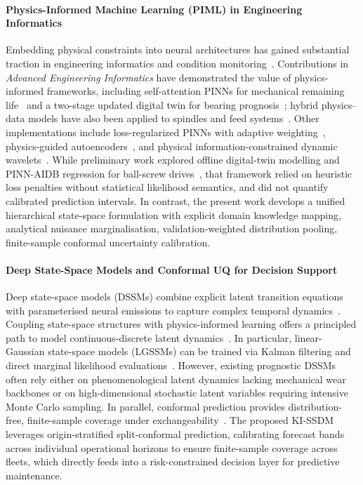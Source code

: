 \documentclass[a4paper,fleqn]{cas-dc}
\begin{document}
\paragraph{Physics-Informed Machine Learning (PIML) in Engineering Informatics}
Embedding physical constraints into neural architectures has gained substantial traction in engineering informatics and condition monitoring~\cite{Wu_2024, Xu_2023, Yan_2026, Lai_2024}. Contributions in \emph{Advanced Engineering Informatics} have demonstrated the value of physics-informed frameworks, including self-attention PINNs for mechanical remaining life~\cite{Liao_2023} and a two-stage updated digital twin for bearing prognosis~\cite{D_He_2025}; hybrid physics--data models have also been applied to spindles and feed systems~\cite{Tai_2023, Zhang_2025, Yuan_2024}. Other implementations include loss-regularized PINNs with adaptive weighting~\cite{Yan_2026, P_Zhang_2026}, physics-guided autoencoders~\cite{Lai_2024}, and physical information-constrained dynamic wavelets~\cite{Zhao_2026}. While preliminary work explored offline digital-twin modelling and PINN-AIDB regression for ball-screw drives~\cite{PriorWork_MSSP_2026}, that framework relied on heuristic loss penalties without statistical likelihood semantics,  and did not quantify calibrated prediction intervals. In contrast, the present work develops a unified hierarchical state-space formulation with explicit domain knowledge mapping, analytical nuisance marginalisation, validation-weighted distribution pooling, finite-sample conformal uncertainty calibration.

\paragraph{Deep State-Space Models and Conformal UQ for Decision Support}
Deep state-space models (DSSMs) combine explicit latent transition equations with parameterised neural emissions to capture complex temporal dynamics~\cite{Marco_2026, Jiaxin_2025}. Coupling state-space structures with physics-informed learning offers a principled path to model continuous-discrete latent dynamics~\cite{Arnold_2021}. In particular, linear-Gaussian state-space models (LGSSMs) can be trained via Kalman filtering and direct marginal likelihood evaluations~\cite{Marco_2026}. However, existing prognostic DSSMs often rely either on phenomenological latent dynamics lacking mechanical wear backbones or on high-dimensional stochastic latent variables requiring intensive Monte Carlo sampling. In parallel, conformal prediction provides distribution-free, finite-sample coverage under exchangeability~\cite{Angelopoulos_2023, Zhang_CP_2025}. The proposed KI-SSDM leverages origin-stratified split-conformal prediction, calibrating forecast bands across individual operational horizons to ensure finite-sample coverage across fleets, which directly feeds into a risk-constrained decision layer for predictive maintenance.
\end{document}
